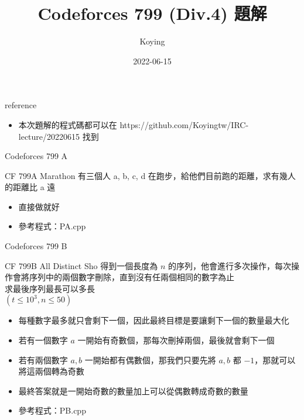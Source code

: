 \documentclass[aspectratio=169]{beamer}
\title{Codeforces 799 (Div.4) 題解}
\author{Koying}
\date{2022-06-15}
\begin{document}
    \begin{frame}
        \titlepage
    \end{frame}     

    \begin{frame}{reference}
    
    	\begin{itemize}
    		\item 本次題解的程式碼都可以在 https://github.com/Koyingtw/IRC-lecture/20220615 找到 
    	\end{itemize}
    	
    \end{frame}
    
    \begin{frame}{Codeforces 799 A}
    	\begin{block}{CF 799A Marathon}
    		有三個人 a, b, c, d 在跑步，給他們目前跑的距離，求有幾人的距離比 a 遠
    	\end{block}

		\begin{itemize}
			\item 直接做就好
			\item 參考程式：PA.cpp
		\end{itemize}		    	
    \end{frame}
    
    \begin{frame}{Codeforces 799 B}
    	\begin{block}{CF 799B All Distinct}
    		Sho 得到一個長度為 $n$ 的序列，他會進行多次操作，每次操作會將序列中的兩個數字刪除，直到沒有任兩個相同的數字為止\\
    		求最後序列最長可以多長\\
    		$(t \le 10^3, n \le 50)$
    	\end{block}
    	
    	\begin{itemize}
    		\item 每種數字最多就只會剩下一個，因此最終目標是要讓剩下一個的數量最大化
    		\item 若有一個數字 $a$ 一開始有奇數個，那每次刪掉兩個，最後就會剩下一個
    		\item 若有兩個數字 $a,b$ 一開始都有偶數個，那我們只要先將 $a,b$ 都 $-1$，那就可以將這兩個轉為奇數
    		\item 最終答案就是一開始奇數的數量加上可以從偶數轉成奇數的數量
    		\item 參考程式：PB.cpp
    	\end{itemize}
    \end{frame}
    
\end{document}
